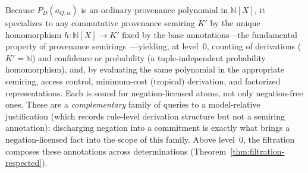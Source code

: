 \noindent
Because $P_D(a_{Q,\alpha})$ is an ordinary provenance polynomial in
$\mathbb{N}[X]$, it specializes to any commutative provenance semiring $K'$ by
the unique homomorphism $h:\mathbb{N}[X]\to K'$ fixed by the base
annotations---the fundamental property of provenance
semirings~\cite{green2007provenance}---yielding, at level~$0$, counting of
derivations ($K'=\mathbb{N}$) and confidence or probability (a
tuple-independent probability homomorphism), and, by evaluating the same
polynomial in the appropriate semiring, access control, minimum-cost
(tropical) derivation, and factorized representations. Each is sound for
negation-licensed atoms, not only negation-free ones. These are a
\emph{complementary} family of queries to a model-relative justification
(which records rule-level derivation structure but not a semiring annotation):
discharging negation into a commitment is exactly what brings a
negation-licensed fact into the scope of this family. Above level~$0$, the
filtration composes these annotations across determinations
(Theorem~\ref{thm:filtration-respected}).
